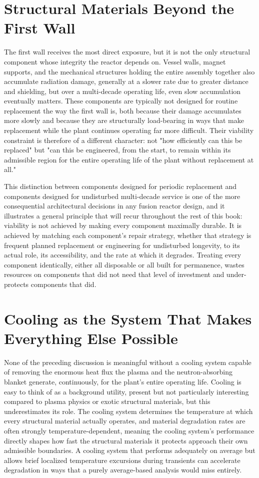 \section{Structural Materials Beyond the First Wall}

The first wall receives the most direct exposure, but it is not the only structural component whose integrity the reactor depends on. Vessel walls, magnet supports, and the mechanical structures holding the entire assembly together also accumulate radiation damage, generally at a slower rate due to greater distance and shielding, but over a multi-decade operating life, even slow accumulation eventually matters. These components are typically not designed for routine replacement the way the first wall is, both because their damage accumulates more slowly and because they are structurally load-bearing in ways that make replacement while the plant continues operating far more difficult. Their viability constraint is therefore of a different character: not "how efficiently can this be replaced" but "can this be engineered, from the start, to remain within its admissible region for the entire operating life of the plant without replacement at all."

This distinction between components designed for periodic replacement and components designed for undisturbed multi-decade service is one of the more consequential architectural decisions in any fusion reactor design, and it illustrates a general principle that will recur throughout the rest of this book: viability is not achieved by making every component maximally durable. It is achieved by matching each component's repair strategy, whether that strategy is frequent planned replacement or engineering for undisturbed longevity, to its actual role, its accessibility, and the rate at which it degrades. Treating every component identically, either all disposable or all built for permanence, wastes resources on components that did not need that level of investment and under-protects components that did.

\section{Cooling as the System That Makes Everything Else Possible}

None of the preceding discussion is meaningful without a cooling system capable of removing the enormous heat flux the plasma and the neutron-absorbing blanket generate, continuously, for the plant's entire operating life. Cooling is easy to think of as a background utility, present but not particularly interesting compared to plasma physics or exotic structural materials, but this underestimates its role. The cooling system determines the temperature at which every structural material actually operates, and material degradation rates are often strongly temperature-dependent, meaning the cooling system's performance directly shapes how fast the structural materials it protects approach their own admissible boundaries. A cooling system that performs adequately on average but allows brief localized temperature excursions during transients can accelerate degradation in ways that a purely average-based analysis would miss entirely.


